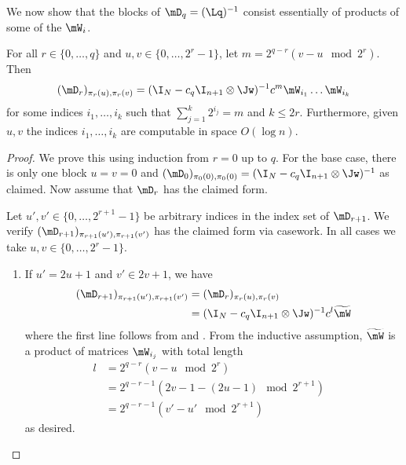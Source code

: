 \documentclass{toc}
\begin{document}
We now show that the blocks of $\mD_q=(\Lq)^{-1}$ consist essentially of products of
%
some of the $\mW_i$.  %
\begin{lemma}\label{lem:labelstruct}
For all $r \in \{0,\ldots,q\}$ and $u,v\in \{0,\ldots,2^{r}-1\}$, let $m=2^{q-r}(v-u \mod 2^{r})$. Then
$$(\mD_r)_{\pi_{r}(u),\pi_{r}(v)}=(\I_N-c_q\I_{n+1}\otimes\Jw)^{-1}c^{m}\mW_{i_1}\dots \mW_{i_k}$$
for some indices $i_1,\dots,i_k$ such that $\sum_{j=1}^k 2^{i_j}=m$ and $k\leq 2r$. Furthermore, given $u,v$ the indices $i_1,\ldots,i_k$ are computable in space $O(\log n)$.
\end{lemma}
\begin{proof}
We prove this using induction from $r=0$ up to $q$. For the base case, there is only one block $u=v=0$ and $(\mD_{0})_{\pi_0(0),\pi_0(0)}=(\I_N-c_q\I_{n+1}\otimes\Jw)^{-1}$ as claimed.
Now assume that $\mD_{r}$ has the claimed form.

Let $u',v'\in \{0,\ldots,2^{r+1}-1\}$ be arbitrary indices in the index set of $\mD_{r+1}$. We verify $(\mD_{r+1})_{\pi_{r+1}(u'),\pi_{r+1}(v')}$ has the claimed form via casework. In all cases we take $u,v\in \{0,\ldots,2^r-1\}$.

\begin{enumerate}
    \item If $u'=2u+1$ and $v'\in 2v+1$, we have
    \begin{align*}
        (\mD_{r+1})_{\pi_{r+1}(u'),\pi_{r+1}(v')} &= (\mD_{r})_{\pi_r(u),\pi_r(v)}\\
        &= (\I_N-c_q\I_{n+1}\otimes\Jw)^{-1}c^{l}\widetilde{\mW}
    \end{align*}
    where the first line follows from  and . From the inductive assumption, $\widetilde{\mW}$ is a product of matrices $\mW_{i_j}$ with total length
    \begin{align*}
        l &=2^{q-r}(v-u \mod 2^{r})&\\
        &=2^{q-r-1}(2v-1-(2u-1) \mod 2^{r+1})\\
        &=2^{q-r-1}(v'-u' \mod 2^{r+1})
    \end{align*} 
    as desired.
    

\end{enumerate}
\end{proof}
\end{document}
